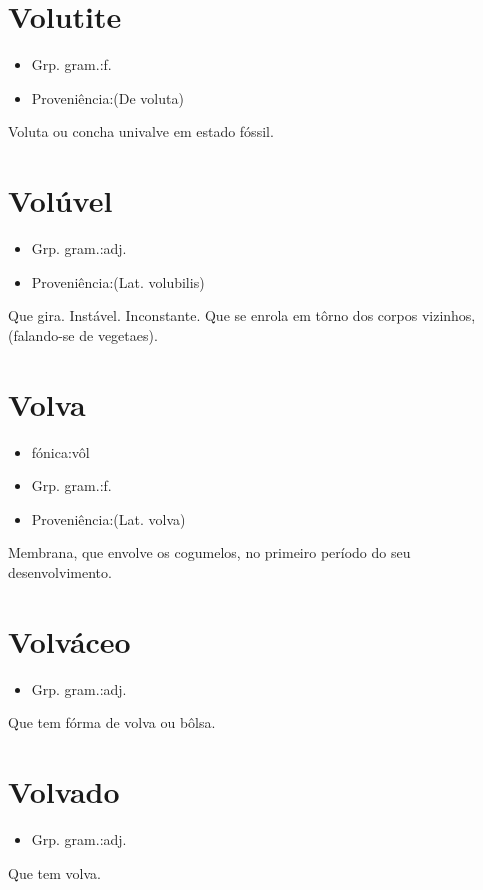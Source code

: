 \documentclass{article}
\begin{document}
\section{Volutite}
\begin{itemize}
\item {Grp. gram.:f.}
\end{itemize}
\begin{itemize}
\item {Proveniência:(De \textunderscore voluta\textunderscore )}
\end{itemize}
Voluta ou concha univalve em estado fóssil.
\section{Volúvel}
\begin{itemize}
\item {Grp. gram.:adj.}
\end{itemize}
\begin{itemize}
\item {Proveniência:(Lat. \textunderscore volubilis\textunderscore )}
\end{itemize}
Que gira.
Instável.
Inconstante.
Que se enrola em tôrno dos corpos vizinhos, (falando-se de vegetaes).
\section{Volva}
\begin{itemize}
\item {fónica:vôl}
\end{itemize}
\begin{itemize}
\item {Grp. gram.:f.}
\end{itemize}
\begin{itemize}
\item {Proveniência:(Lat. \textunderscore volva\textunderscore )}
\end{itemize}
Membrana, que envolve os cogumelos, no primeiro período do seu desenvolvimento.
\section{Volváceo}
\begin{itemize}
\item {Grp. gram.:adj.}
\end{itemize}
Que tem fórma de volva ou bôlsa.
\section{Volvado}
\begin{itemize}
\item {Grp. gram.:adj.}
\end{itemize}
Que tem volva.
\end{document}
